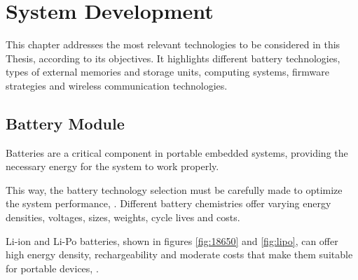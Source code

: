 \chapter{System Development}
\label{chap:Chapter4}

This chapter addresses the most relevant technologies to be considered in this Thesis, according to its objectives.
It highlights different battery technologies, types of external memories and storage units, computing systems, firmware strategies and wireless communication technologies.

\section{Battery Module}

Batteries are a critical component in portable embedded systems, providing the necessary energy for the system to work properly.

This way, the battery technology selection must be carefully made to optimize the system performance, \cite{BATT3}.
Different battery chemistries offer varying energy densities, voltages, sizes, weights, cycle lives and costs.

\gls{Li-ion} and \gls{Li-Po} batteries, shown in figures \ref{fig:18650} and \ref{fig:lipo}, can offer high energy density, rechargeability and moderate costs that make them suitable for portable devices, \cite{BATT7}.

